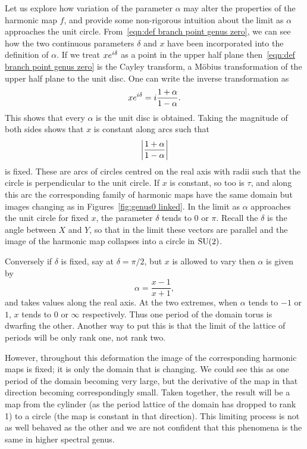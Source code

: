 \documentclass{article}
\begin{document}
Let us explore how variation of the parameter $\alpha$ may alter the properties of the harmonic map $f$, and provide some non-rigorous intuition about the limit as $\alpha$ approaches the unit circle. From~\eqref{eqn:def branch point genus zero}, we can see how the two continuous parameters $\delta$ and $x$ have been incorporated into the definition of $\alpha$. If we treat $xe^{i \delta}$ as a point in the upper half plane then~\eqref{eqn:def branch point genus zero} is the Cayley transform, a M\"obius transformation of the upper half plane to the unit disc. One can write the inverse transformation as
\[
x e^{i \delta} = i \frac{1+\alpha}{1-\alpha}.
\]
This shows that every $\alpha$ is the unit disc is obtained. Taking the magnitude of both sides shows that $x$ is constant along arcs such that
\[
\left|\frac{1+\alpha}{1-\alpha}\right|
\]
is fixed. 
These are arcs of circles centred on the real axis with radii such that the circle is perpendicular to the unit circle. 
If $x$ is constant, so too is $\tau$, and along this arc the corresponding family of harmonic maps have the same domain but images changing as in Figures~\ref{fig:genus0 linked}.
In the limit as $\alpha$ approaches the unit circle for fixed $x$, the parameter $\delta$ tends to $0$ or $\pi$. Recall the $\delta$ is the angle between $X$ and $Y$, so that in the limit these vectors are parallel and the image of the harmonic map collapses into a circle in $\mathrm{SU}(2)$.

Conversely if $\delta$ is fixed, say at $\delta=\pi/2$, but $x$ is allowed to vary then $\alpha$ is given by
\[
\alpha = \frac{x-1}{x+1},
\]
and takes values along the real axis. At the two extremes, when $\alpha$ tends to $-1$ or $1$, $x$ tends to $0$ or $\infty$ respectively. Thus one period of the domain torus is dwarfing the other. Another way to put this is that the limit of the lattice of periods will be only rank one, not rank two. 

However, throughout this deformation the image of the corresponding harmonic maps is fixed; it is only the domain that is changing. We could see this as one period of the domain becoming very large, but the derivative of the map in that direction becoming correspondingly small. Taken together, the result will be a map from the cylinder (as the period lattice of the domain has dropped to rank 1) to a circle (the map is constant in that direction). This limiting process is not as well behaved as the other and we are not confident that this phenomena is the same in higher spectral genus.
\end{document}
